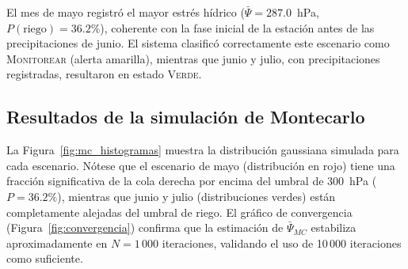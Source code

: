 \documentclass[12pt,a4paper]{article}
\begin{document}
\noindent El mes de mayo registró el mayor estrés hídrico ($\bar{\Psi} = 287.0$~hPa, $P(\text{riego}) = 36.2\%$), coherente con la fase inicial de la estación antes de las precipitaciones de junio. El sistema clasificó correctamente este escenario como \textsc{Monitorear} (alerta amarilla), mientras que junio y julio, con precipitaciones registradas, resultaron en estado \textsc{Verde}.

\subsection{Resultados de la simulación de Montecarlo}

\begin{table}[H]
\centering
\small
\caption{Resultados de la Simulación de Montecarlo por escenario (10\,000 iteraciones, umbral riego: 300~hPa).}
\label{tab:mc_resultados}
\end{table}

La Figura~\ref{fig:mc_histogramas} muestra la distribución gaussiana simulada para cada escenario. Nótese que el escenario de mayo (distribución en rojo) tiene una fracción significativa de la cola derecha por encima del umbral de 300~hPa ($P = 36.2\%$), mientras que junio y julio (distribuciones verdes) están completamente alejadas del umbral de riego. El gráfico de convergencia (Figura~\ref{fig:convergencia}) confirma que la estimación de $\bar{\Psi}_{MC}$ estabiliza aproximadamente en $N = 1\,000$ iteraciones, validando el uso de 10\,000 iteraciones como suficiente.
\end{document}
